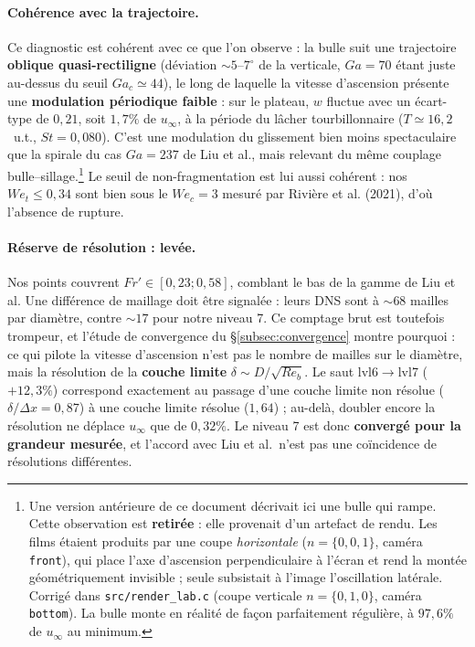 \paragraph{Cohérence avec la trajectoire.} Ce diagnostic est cohérent avec ce que l'on
observe :
la bulle suit une trajectoire \textbf{oblique quasi-rectiligne} (déviation ${\sim}5$--$7^\circ$
de la verticale, $Ga=70$ étant juste au-dessus du seuil $Ga_c\simeq44$), le long de
laquelle la vitesse d'ascension présente une \textbf{modulation périodique faible} :
sur le plateau, $w$ fluctue avec un écart-type de $0{,}21$, soit $1{,}7\%$ de
$u_\infty$, à la période du lâcher tourbillonnaire ($T\simeq16{,}2$~u.t.,
$St=0{,}080$). C'est une modulation du glissement bien moins spectaculaire que la
spirale du cas $Ga=237$ de Liu et al., mais relevant du même couplage
bulle--sillage.\footnote{Une version antérieure de ce document décrivait ici une
bulle qui \og{}rampe\fg{}. Cette observation est \textbf{retirée} : elle provenait
d'un artefact de rendu. Les films étaient produits par une coupe \emph{horizontale}
($n=\{0,0,1\}$, caméra \texttt{front}), qui place l'axe d'ascension perpendiculaire à
l'écran et rend la montée géométriquement invisible ; seule subsistait à l'image
l'oscillation latérale. Corrigé dans \texttt{src/render\_lab.c} (coupe verticale
$n=\{0,1,0\}$, caméra \texttt{bottom}). La bulle monte en réalité de façon
parfaitement régulière, à $97{,}6\%$ de $u_\infty$ au minimum.}
Le seuil de non-fragmentation est lui aussi cohérent : nos $We_t\le0{,}34$ sont bien
sous le $We_c=3$ mesuré par Rivière et al. (2021), d'où l'absence de rupture.

\paragraph{Réserve de résolution : levée.} Nos points couvrent
$Fr'\in[0{,}23;0{,}58]$, comblant le bas de la gamme de Liu et al. Une différence de
maillage doit être signalée : leurs DNS sont à ${\sim}68$ mailles par diamètre,
contre ${\sim}17$ pour notre niveau 7. Ce comptage brut est toutefois trompeur, et
l'étude de convergence du \S\ref{subsec:convergence} montre pourquoi : ce qui pilote
la vitesse d'ascension n'est pas le nombre de mailles sur le diamètre, mais la
résolution de la \textbf{couche limite} $\delta\sim D/\sqrt{Re_b}$. Le saut
lvl6$\to$lvl7 ($+12{,}3\%$) correspond exactement au passage d'une couche limite non
résolue ($\delta/\Delta x=0{,}87$) à une couche limite résolue ($1{,}64$) ; au-delà,
doubler encore la résolution ne déplace $u_\infty$ que de $0{,}32\%$. Le niveau 7 est
donc \textbf{convergé pour la grandeur mesurée}, et l'accord avec Liu et al.\ n'est
pas une coïncidence de résolutions différentes.

